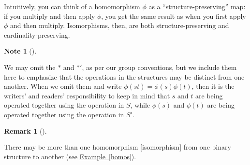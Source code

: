 \documentclass[10pt,]{book}
\theoremstyle{plain}
\theoremstyle{definition}
\theoremstyle{definition}
\newtheorem{remark}[theorem]{Remark}
\newtheorem{note}[theorem]{Note}
\theoremstyle{definition}
\theoremstyle{definition}
\numberwithin{equation}{section}
\begin{document}
    Intuitively, you can think of a homomorphism \(\phi\) as a
    ``structure-preserving'' map: if you multiply and then apply \(\phi\),
    you get the same result as when you first apply \(\phi\) and then
    multiply. Isomorphisms, then, are both structure-preserving and
    cardinality-preserving.
\begin{note}[]\label{note-7}

    We may omit the \(*\) and \(*'\), as per our group conventions, but we include them here to emphasize that the operations in the structures may be distinct from one another. When we omit them and write \(\phi(st)=\phi(s)\phi(t)\), then it is the writers' and readers' responsibility to keep in mind that \(s\) and \(t\) are being operated together using the operation in \(S\), while \(\phi(s)\) and \(\phi(t)\) are being operated together using the operation in \(S'\).
\end{note}
\begin{remark}[]\label{remark-17}

      There may be more than one homomorphism
      [isomorphism] from one binary structure to another (see \hyperref[homos]{Example~\ref{homos}}).
\end{remark}
\end{document}
